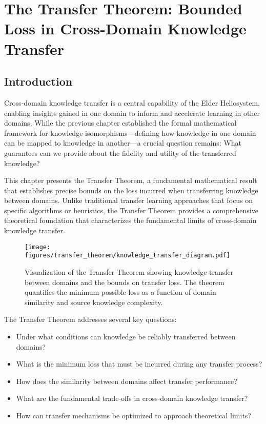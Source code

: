 \chapter{The Transfer Theorem: Bounded Loss in Cross-Domain Knowledge Transfer}

\section{Introduction}

Cross-domain knowledge transfer is a central capability of the Elder Heliosystem, enabling insights gained in one domain to inform and accelerate learning in other domains. While the previous chapter established the formal mathematical framework for knowledge isomorphisms—defining how knowledge in one domain can be mapped to knowledge in another—a crucial question remains: What guarantees can we provide about the fidelity and utility of the transferred knowledge?

This chapter presents the Transfer Theorem, a fundamental mathematical result that establishes precise bounds on the loss incurred when transferring knowledge between domains. Unlike traditional transfer learning approaches that focus on specific algorithms or heuristics, the Transfer Theorem provides a comprehensive theoretical foundation that characterizes the fundamental limits of cross-domain knowledge transfer.

\begin{figure}[ht]
    \centering
    \texttt{[image: figures/transfer\_theorem/knowledge\_transfer\_diagram.pdf]}
    \caption{Visualization of the Transfer Theorem showing knowledge transfer between domains and the bounds on transfer loss. The theorem quantifies the minimum possible loss as a function of domain similarity and source knowledge complexity.}
    \label{fig:transfer_theorem_diagram}
\end{figure}

The Transfer Theorem addresses several key questions:
\begin{itemize}
    \item Under what conditions can knowledge be reliably transferred between domains?
    \item What is the minimum loss that must be incurred during any transfer process?
    \item How does the similarity between domains affect transfer performance?
    \item What are the fundamental trade-offs in cross-domain knowledge transfer?
    \item How can transfer mechanisms be optimized to approach theoretical limits?
\end{itemize}

